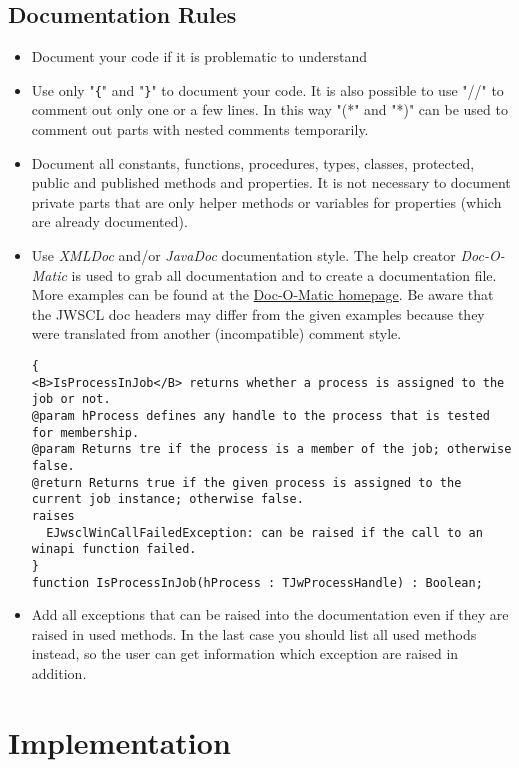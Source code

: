 \documentclass[a4paper,oneside,10pt]{article}
\begin{document}
\subsection{Documentation Rules}
\begin{itemize}
	\item Document your code if it is problematic to understand
	\item Use only "\verb#{#" and "\verb#}#" to document your code. It is also possible to use "//" to comment out only one or a few lines. In this way "(*" and "*)" can be used to comment out parts with nested comments temporarily.
	\item Document all constants, functions, procedures, types, classes, protected, public and published methods and properties. It is not necessary to document private parts that are only helper methods or variables for properties (which are already documented).
	\item Use \textit{XMLDoc} and/or \textit{JavaDoc} documentation style. The help creator \textit{Doc-O-Matic} is used to grab all documentation and to create a documentation file.\\
More examples can be found at the \href{http://www.doc-o-matic.com/examplesourcecode.html}{Doc-O-Matic homepage}.
Be aware that the JWSCL doc headers may differ from the given examples because they were translated from another (incompatible) comment style.
\begin{lstlisting}  
{
<B>IsProcessInJob</B> returns whether a process is assigned to the job or not.
@param hProcess defines any handle to the process that is tested for membership.
@param Returns tre if the process is a member of the job; otherwise false.
@return Returns true if the given process is assigned to the current job instance; otherwise false.
raises
  EJwsclWinCallFailedException: can be raised if the call to an winapi function failed.
}
function IsProcessInJob(hProcess : TJwProcessHandle) : Boolean;
\end{lstlisting}

\item Add all exceptions that can be raised into the documentation even if they are raised in used methods. In the last case you should list all used methods instead, so the user can get information which exception are raised in addition.

\end{itemize}

\section{Implementation}
\end{document}
